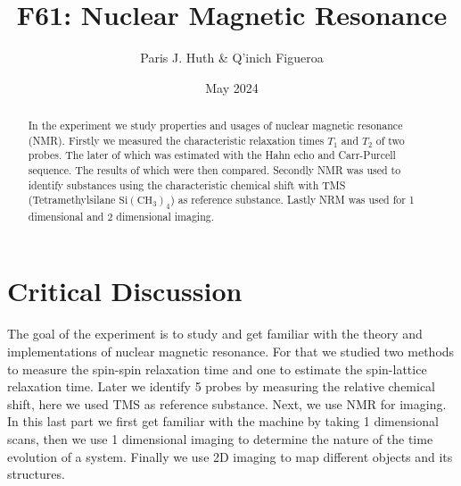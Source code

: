 \documentclass[11 pt]{article}
\title{F61: Nuclear Magnetic Resonance}
\author{Paris J. Huth \& Q'inich Figueroa}
\date{May 2024}
\begin{document}
\maketitle
\begin{center}
\begin{abstract}
In the experiment we study properties and usages of nuclear magnetic resonance (NMR). Firstly we measured the characteristic relaxation times $T_1$ and $T_2$ of two probes. The later of which was estimated with the Hahn echo and Carr-Purcell sequence. The results of which were then compared. Secondly NMR was used to identify substances using  the characteristic chemical shift with TMS (Tetramethylsilane $\mathrm{Si}\left(\mathrm{CH_3}\right)_4$) as reference substance. Lastly NRM was used for 1 dimensional and 2 dimensional imaging.  
\end{abstract}
\end{center}




\section{Critical Discussion}
The goal of the experiment is to study and get familiar with the theory and implementations of nuclear magnetic resonance. For that we studied two methods to measure the spin-spin relaxation time and one to estimate the spin-lattice relaxation time. Later we identify 5 probes by measuring the relative chemical shift, here we used TMS as reference substance. Next, we use NMR for imaging. In this last part we first get familiar with the machine by taking 1 dimensional scans, then we use 1 dimensional imaging to determine the nature of the time evolution of a system. Finally we use 2D imaging to map different objects and its structures. 





\end{document}
